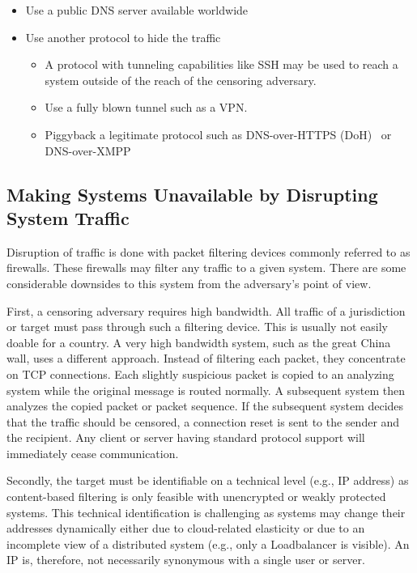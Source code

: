 \begin{itemize}
	\item Use a public DNS server available worldwide 
	\item Use another protocol to hide the traffic 
	\begin{itemize}
		\item A protocol with tunneling capabilities like SSH may be used to reach a system outside of the reach of the censoring adversary.
		\item Use a fully blown tunnel such as a VPN.
		\item Piggyback a legitimate protocol such as DNS-over-HTTPS (DoH)~\cite{rfc8484} or DNS-over-XMPP~\cite{xep0418}
	\end{itemize}
\end{itemize}

\subsection{Making Systems Unavailable by Disrupting System Traffic}
Disruption of traffic is done with packet filtering devices commonly referred to as firewalls. These firewalls may filter any traffic to a given system. There are some considerable downsides to this system from the adversary's point of view.

First, a censoring adversary requires high bandwidth. All traffic of a jurisdiction or target must pass through such a filtering device. This is usually not easily doable for a country. A very high bandwidth system, such as the great China wall, uses a different approach. Instead of filtering each packet, they concentrate on TCP connections. Each slightly suspicious packet is copied to an analyzing system while the original message is routed normally. A subsequent system then analyzes the copied packet or packet sequence. If the subsequent system decides that the traffic should be censored, a connection reset is sent to the sender and the recipient. Any client or server having standard protocol support will immediately cease communication.

Secondly, the target must be identifiable on a technical level (e.g., IP address) as content-based filtering is only feasible with unencrypted or weakly protected systems. This technical identification is challenging as systems may change their addresses dynamically either due to cloud-related elasticity or due to an incomplete view of a distributed system (e.g., only a Loadbalancer is visible). An IP is, therefore, not necessarily synonymous with a single user or server. 

